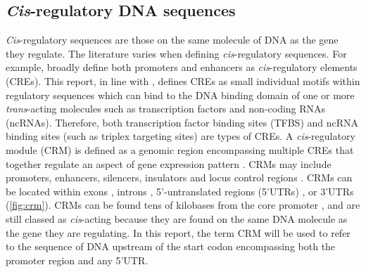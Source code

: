 \documentclass[../main.tex]{subfiles}
\begin{document}
\subsection{\texorpdfstring{\textit{Cis}-regulatory DNA sequences}{Cis\hyp{}regulatory DNA sequences}}\label{chapter1:cis-regulatory-dna-sequences}
\textit{Cis}\hyp{}regulatory sequences are those on the same molecule of DNA as the gene they regulate.
The literature varies when defining \textit{cis}\hyp{}regulatory sequences.
For example, \textcite*{wittkoppCisregulatoryElementsMolecular2012} broadly define both promoters and enhancers as \textit{cis}\hyp{}regulatory elements (CREs).
This report, in line with \textcite*{swinnenLessonsDomesticationTargeting2016}, defines CREs as small individual motifs within regulatory sequences which can bind to the DNA binding domain of one or more \textit{trans}\hyp{}acting molecules such as transcription factors and non\hyp{}coding RNAs (ncRNAs).
Therefore, both transcription factor binding sites (TFBS) and ncRNA binding sites (such as triplex targeting sites) are types of CREs.
A \textit{cis}\hyp{}regulatory module (CRM) is defined as a genomic region encompassing multiple CREs that together regulate an aspect of gene expression pattern \autocite{guoNewAlgorithmIdentifying2017}.
CRMs may include promoters, enhancers, silencers, insulators and locus control regions \autocite{jeziorskaSystemsBiologyApproach2009}.
CRMs can be located within exons \autocite{tumpelRegulatoryModuleEmbedded2008}, introns \autocite{ostrovskyIdentificationStrongIntron2018}, 5’\hyp{}untranslated regions (5’UTRs) \autocite{bolleSegmentsEncodingUntranslated1994,henrySharedCisregulatoryModule2018}, or 3’UTRs \autocite{palmerEnhancerControlsSnail2007,yochumGenomewideScreenBetacatenin2008} (\autoref{fig:crm}).
CRMs can be found tens of kilobases from the core promoter \autocite{bien-willnerSOX9cre1CisactingRegulatory2007,okaGenomewideMappingTranscriptional2017}, and are still classed as \textit{cis}\hyp{}acting because they are found on the same DNA molecule as the gene they are regulating.
In this report, the term CRM will be used to refer to the sequence of DNA upstream of the start codon encompassing both the promoter region and any 5’UTR.

\end{document}
